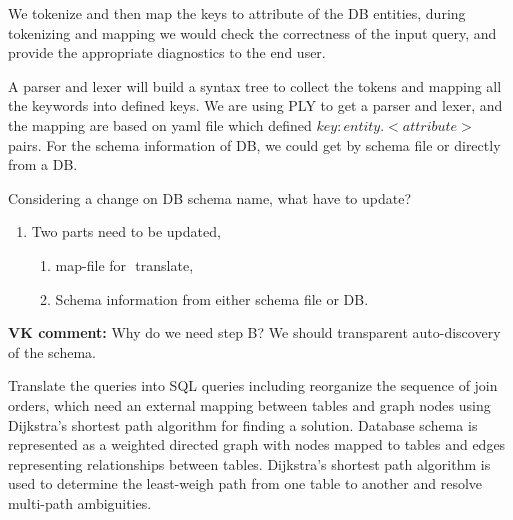  We tokenize and then map the keys to attribute of the DB entities, during tokenizing and mapping we would check the correctness of the input query, and provide the appropriate diagnostics to the end user.

 A parser and lexer will build a syntax tree to collect the tokens and mapping all the keywords into defined keys. We are using PLY to get a parser and lexer, and the mapping are based on yaml file which defined \(key : entity.<attribute>\) pairs. For the schema information of DB, we could get by schema file or directly from a DB.

Considering a change on DB schema name, what have to update?
\begin{enumerate}
\item Two parts need to be updated,
    \begin{enumerate} 
    \item map-file for \(<key: entity>\) translate,
    \item Schema information from either schema file or DB.
    \end{enumerate}
\end{enumerate}

{\bf VK comment:} Why do we need step B? We should transparent auto-discovery of the schema.

Translate the queries into SQL queries including reorganize the sequence of join orders, which need an external mapping between tables and graph nodes using Dijkstra's shortest path algorithm for finding a solution. Database schema is represented as a weighted directed graph with nodes mapped to tables and edges representing relationships between tables. Dijkstra's shortest path algorithm is used to determine the least-weigh path from one table to another and resolve multi-path ambiguities.

